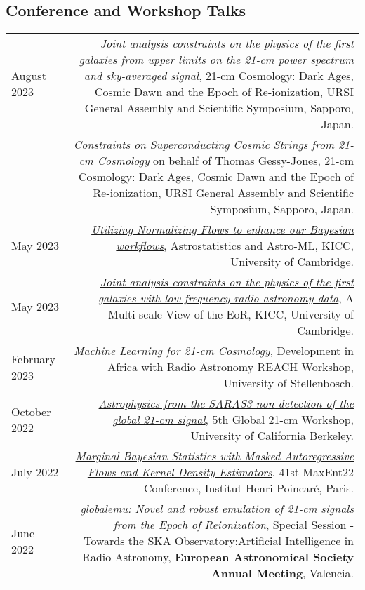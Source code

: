 \documentclass{article}
\begin{document}
\subsection*{Conference and Workshop Talks}
\begin{tabular}{L!{\vrule}R}
    August 2023 & \textit{Joint analysis constraints on the physics of the first galaxies from upper limits on the 21-cm power spectrum and sky-averaged signal}, 21-cm Cosmology: Dark Ages, Cosmic Dawn and the Epoch of Re-ionization, URSI General Assembly and Scientific Symposium, Sapporo, Japan. \\
    & \textit{Constraints on Superconducting Cosmic Strings from 21-cm Cosmology} on behalf of Thomas Gessy-Jones, 21-cm Cosmology: Dark Ages, Cosmic Dawn and the Epoch of Re-ionization, URSI General Assembly and Scientific Symposium, Sapporo, Japan. \\
    May 2023 & \href{https://github.com/htjb/Talks/blob/master/Talks/KICC_EoR/Bevins_KICC_EoR.pdf}{\textit{Utilizing Normalizing Flows to enhance our Bayesian workflows}}, Astrostatistics and Astro-ML, KICC, University of Cambridge. \\
    May 2023 & \href{https://github.com/htjb/Talks/blob/master/Talks/KICC_EoR/Bevins_KICC_EoR.pdf}{\textit{Joint analysis constraints on the physics of the first galaxies with low frequency radio astronomy data}}, A Multi-scale View of the EoR, KICC, University of Cambridge. \\
    February 2023 & \href{https://github.com/htjb/Talks/blob/master/Talks/DARA_REACH_Workshop/DARA_Workshop.pdf}{\textit{Machine Learning for 21-cm Cosmology}}, Development in Africa with Radio Astronomy REACH Workshop, University of Stellenbosch. \\
    October 2022 & \href{https://global21cmworkshop.org/2022-berkeley/}{\textit{Astrophysics from the SARAS3 non-detection of the global 21-cm signal}}, 5th Global 21-cm Workshop, University of California Berkeley. \\
	July 2022 & \href{https://github.com/htjb/Talks/blob/master/Talks/MaxEnt22_margarine_June_2022/MaxEnt_slides.pdf}{\textit{Marginal Bayesian Statistics with Masked Autoregressive Flows and Kernel Density Estimators}}, 41st MaxEnt22 Conference, Institut Henri Poincar\'e, Paris. \\
	June 2022 & \href{https://github.com/htjb/Talks/blob/master/Talks/ESA_globalemu_July_2022/AUDITORIUM\%203A_SS23a_0940_Bevins.pdf}{\textit{globalemu: Novel and robust emulation of 21-cm signals from the Epoch of Reionization}}, Special Session - Towards the SKA Observatory:Artificial Intelligence in Radio Astronomy, \textbf{European Astronomical Society Annual Meeting}, Valencia. \\

\end{tabular}
\end{document}
